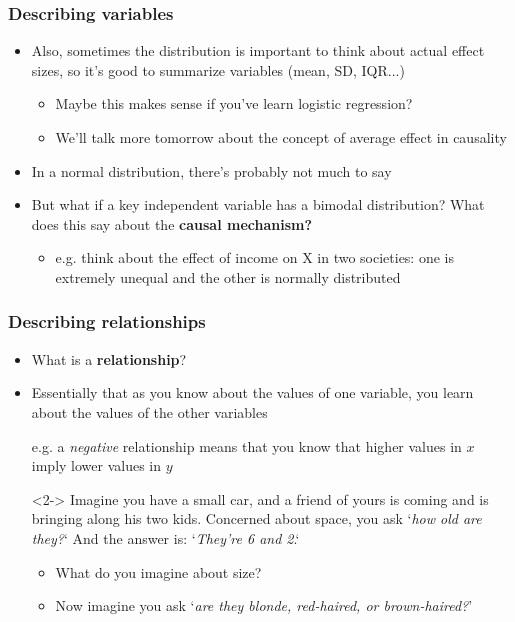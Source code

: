 \documentclass[aspectratio=43]{beamer}
\begin{document}
\begin{frame}
\frametitle{Describing variables}
\centering

\begin{itemize}
  \item Also, sometimes the distribution is important to think about actual effect sizes, so it's good to summarize variables {\footnotesize (mean, SD, IQR...)}
  \begin{itemize}
    \item Maybe this makes sense if you've learn logistic regression?
    \item We'll talk more tomorrow about the concept of average effect in causality
  \end{itemize}
  \item In a normal distribution, there's probably not much to say
  \item But what if a key independent variable has a bimodal distribution? What does this say about the \textbf{causal mechanism?}
  \begin{itemize}
    \item e.g. think about the effect of income on X in two societies: one is extremely unequal and the other is normally distributed
  \end{itemize}
\end{itemize}

\end{frame}

\begin{frame}
\frametitle{Describing relationships}
\centering

\begin{itemize}
  \item What is a \textbf{relationship}?
  \item Essentially that as you know about the values of one variable, you learn about the values of the other variables
  \item[] e.g. a \textit{negative} relationship means that you know that higher values in $x$ imply lower values in $y$
  \item[]
  \item[]<2-> Imagine you have a small car, and a friend of yours is coming and is bringing along his two kids. Concerned about space, you ask `\textit{how old are they?}` And the answer is: `\textit{They're 6 and 2}.`
  \begin{itemize}
    \item What do you imagine about size?
    \item<3-> Now imagine you ask `\textit{are they blonde, red-haired, or brown-haired?}'
  \end{itemize}
\end{itemize}

\end{frame}
\end{document}
